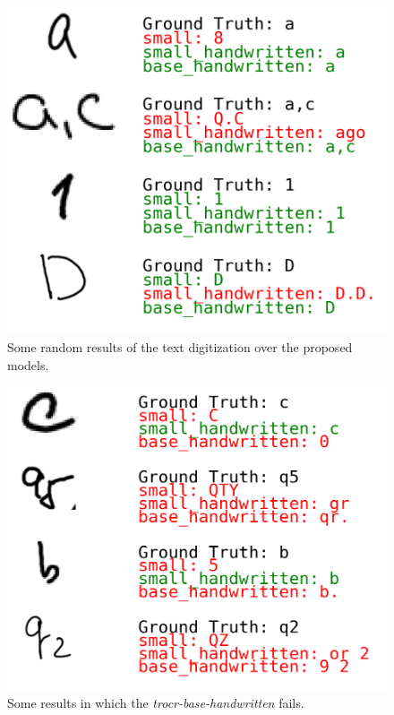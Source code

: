 \documentclass[conference]{IEEEtran}
\begin{document}
\begin{figure}[H]
\centering
\includegraphics[width=\linewidth]{text_digitization_results_1.png}
\caption{Some random results of the text digitization over the proposed models.}
\label{fig:text_digitization_results_1}
\end{figure}

\begin{figure}[H]
\centering
\includegraphics[width=\linewidth]{text_digitization_results_2.png}
\caption{Some results in which the \textit{trocr-base-handwritten} fails.}
\label{fig:text_digitization_results_2}
\end{figure}
\end{document}
